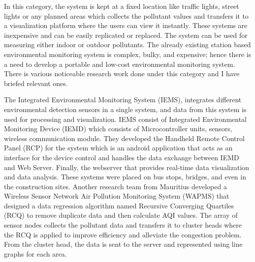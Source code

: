  In this category, the system is kept at a fixed location like traffic lights, street lights or any planned areas \cite{Pavani2017} which collects the pollutant values and transfers it to a visualization platform where the users can view it instantly. These systems are inexpensive and can be easily replicated or replaced. The system can be used for measuring either indoor or outdoor pollutants. The already existing station based environmental monitoring system is complex, bulky, and expensive; hence there is a need to develop a portable and low-cost environmental monitoring system. There is various noticeable research work done under this category and I have briefed relevant ones.
 \par
  The Integrated Environmental Monitoring System (IEMS)\cite{Wong2014}, integrates different environmental detection sensors in a single system, and data from this system is used for processing and visualization. IEMS consist of Integrated Environmental Monitoring Device (IEMD) which consists of Microcontroller units, sensors, wireless communication module. They developed the Handheld Remote Control Panel (RCP) for the system which is an android application that acts as an interface for the device control and handles the data exchange between IEMD and Web Server. Finally, the webserver that provides real-time data visualization and data analysis. These systems were placed on bus stops, bridges, and even in the construction sites. Another research team from Mauritius developed a Wireless Sensor Network Air Pollution Monitoring System (WAPMS) \cite{K.Khedo2010} that designed a data regression algorithm named Recursive Converging Quartiles (RCQ) to remove duplicate data and then calculate AQI values. The array of sensor nodes collects the pollutant data and transfers it to cluster heads where the RCQ is applied to improve efficiency and alleviate the congestion problem. From the cluster head, the data is sent to the server and represented using line graphs for each area.

